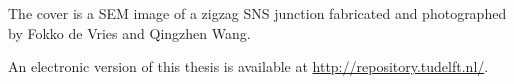 \begin{titlepage}
\begin{center}
The cover is a SEM image of a zigzag SNS junction fabricated and photographed by Fokko de Vries and Qingzhen Wang.
\bigskip

An electronic version of this thesis is available at \url{http://repository.tudelft.nl/}.
\end{center}


\end{titlepage}

